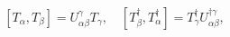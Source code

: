 \begin{equation}\label{5.10}
[T_\alpha,T_\beta]=U^\gamma_{\alpha\beta}T_\gamma,\quad
[T^\dagger_\beta,T^\dagger_\alpha]=T^\dagger_\gamma
U^{\dagger\gamma}_{\alpha\beta},
\end{equation}


